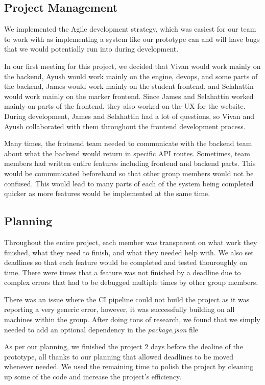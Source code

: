 \documentclass[a4paper, 12pt]{article}
\newcommand{\Example}[1]{\begin{example}#1\end{example}}
\begin{document}
\subsection*{Project Management}
We implemented the Agile development strategy, which was easiest for our team to work with as implementing a system like our prototype can and will have bugs that we would potentially run into during development.

In our first meeting for this project, we decided that Vivan would work mainly on the backend, Ayush would work mainly on the engine, devops, and some parts of the backend, James would work mainly on the student frontend, and Selahattin would work mainly on the marker frontend. Since James and Selahattin worked mainly on parts of the frontend, they also worked on the UX for the website. During development, James and Selahattin had a lot of questions, so Vivan and Ayush collaborated with them throughout the frontend development process.

Many times, the frotnend team needed to communicate with the backend team about what the backend would return in specific API routes. Sometimes, team members had written entire features including frontend and backend parts. This would be communicated beforehand so that other group members would not be confused. This would lead to many parts of each of the system being completed quicker as more features would be implemented at the same time.

\subsection*{Planning}
Throughout the entire project, each member was transparent on what work they finished, what they need to finish, and what they needed help with. We also set deadlines so that each feature would be completed and tested thouroughly on time. There were times that a feature was not finished by a deadline due to complex errors that had to be debugged multiple times by other group members.

\Example {There was an issue where the CI pipeline could not build the project as it was reporting a very generic error, however, it was successfully building on all machines within the group. After doing tons of research, we found that we simply needed to add an optional dependency in the \emph{package.json} file}

As per our planning, we finished the project 2 days before the dealine of the prototype, all thanks to our planning that allowed deadlines to be moved whenever needed. We used the remaining time to polish the project by cleaning up some of the code and increase the project's efficiency.
\end{document}
